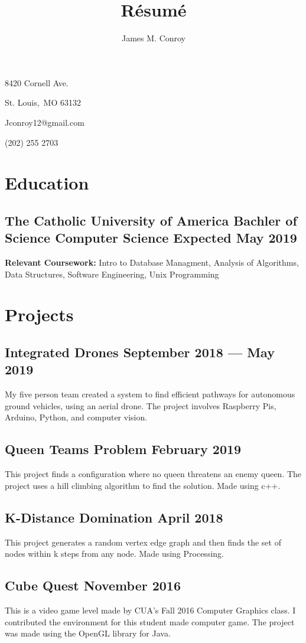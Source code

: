 \documentclass{article}
\author{James M. Conroy}
\title{R\'esum\'e}
\makeatletter
\renewcommand{\maketitle} {
	\begin{center}
	{\huge\bfseries
	\theauthor}

	\end{center}

	8420 Cornell Ave.

	St. Louis,\ MO 63132

	Jconroy12@gmail.com

	(202) 255 2703

}
\makeatother
\begin{document}
\maketitle
\section{Education}
\subsection{The Catholic University of America \hfill Bachler of Science Computer Science \hfill  Expected May 2019 }

\textbf {Relevant Coursework:}
Intro to Database Managment,
Analysis of Algorithms,
Data Structures,
Software Engineering,
Unix Programming

\section{Projects}
\subsection{Integrated Drones \hfill September 2018 --- May 2019}
My five person team created a system to find efficient pathways for autonomous ground vehicles, using an aerial drone.
The project involves Raspberry Pis, Arduino, Python, and computer vision.

\subsection{Queen Teams Problem \hfill February 2019}
This project finds a configuration where no queen threatens an enemy queen.
The project uses a hill climbing algorithm to find the solution.
Made using c++.

\subsection{K-Distance Domination \hfill April 2018}
This project generates a random vertex edge graph and then finds the set of nodes within k steps from any node.
Made using Processing.

\subsection{Cube Quest \hfill November 2016}
This is a video game level made by CUA's Fall 2016 Computer Graphics class.
I contributed the environment for this student made computer game.
The project was made using the OpenGL library for Java.
\end{document}
